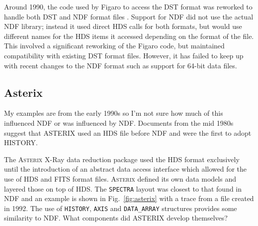 \documentclass[final,authoryear,5p,times,twocolumn]{elsarticle}
\begin{document}
Around 1990, the code used by Figaro to access the DST format was
reworked to handle both DST and NDF format files
\citep{1990STARB...6...18S}. Support for NDF did
not use the actual NDF library; instead it used direct HDS calls for
both formats, but would use different names for the HDS items it
accessed depending on the format of the file. This involved a
significant reworking of the Figaro code, but maintained compatibility
with existing DST format files. However, it has failed to keep up with
recent changes to the NDF format such as support for 64-bit data
files.

\subsection{Asterix}

{\color{red} My examples are from the early 1990s so I'm not sure how
  much of this influenced NDF or was influenced by NDF. Documents from
  the mid 1980s suggest that ASTERIX used an HDS file before NDF and
  were the first to adopt HISTORY.}

The \textsc{Asterix} X-Ray data reduction package \citep{SUN98,1992STARB...9....3S} used the HDS
format exclusively until the introduction of an abstract data access
interface \citep{1995ASPC...77..199A} which allowed for the use of HDS
and FITS format files. \textsc{Asterix} defined its
own data models and layered those on top of HDS. The \texttt{SPECTRA}
layout was closest to that found in NDF and an example is shown in
Fig.\ \ref{fig:asterix} with a trace from a file created in 1992. The
use of \texttt{HISTORY}, \texttt{AXIS} and \texttt{DATA\_ARRAY}
structures provides some similarity to NDF. {\color{red} What
  components did ASTERIX develop themselves?}
\end{document}
